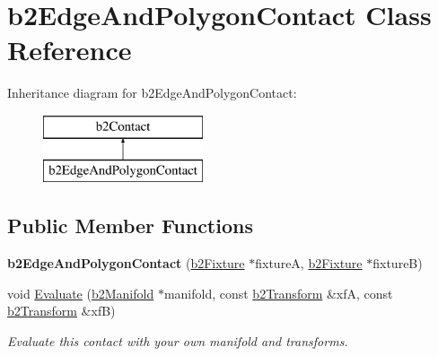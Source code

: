 \hypertarget{classb2_edge_and_polygon_contact}{}\section{b2\+Edge\+And\+Polygon\+Contact Class Reference}
\label{classb2_edge_and_polygon_contact}
Inheritance diagram for b2\+Edge\+And\+Polygon\+Contact\+:\begin{figure}[H]
\begin{center}
\leavevmode
\includegraphics[height=2.000000cm]{classb2_edge_and_polygon_contact}
\end{center}
\end{figure}
\subsection*{Public Member Functions}
\begin{DoxyCompactItemize}
\item 
{\bfseries b2\+Edge\+And\+Polygon\+Contact} (\hyperlink{classb2_fixture}{b2\+Fixture} $\ast$fixtureA, \hyperlink{classb2_fixture}{b2\+Fixture} $\ast$fixtureB)\hypertarget{classb2_edge_and_polygon_contact_a79d9b012c4a0df7d5c3dcecd33df7d5f}{}\label{classb2_edge_and_polygon_contact_a79d9b012c4a0df7d5c3dcecd33df7d5f}

\item 
void \hyperlink{classb2_edge_and_polygon_contact_a5f360f5f0b1d367beb517ba9f380c84b}{Evaluate} (\hyperlink{structb2_manifold}{b2\+Manifold} $\ast$manifold, const \hyperlink{structb2_transform}{b2\+Transform} \&xfA, const \hyperlink{structb2_transform}{b2\+Transform} \&xfB)\hypertarget{classb2_edge_and_polygon_contact_a5f360f5f0b1d367beb517ba9f380c84b}{}\label{classb2_edge_and_polygon_contact_a5f360f5f0b1d367beb517ba9f380c84b}

\begin{DoxyCompactList}\small\item\em Evaluate this contact with your own manifold and transforms. \end{DoxyCompactList}\end{DoxyCompactItemize}
